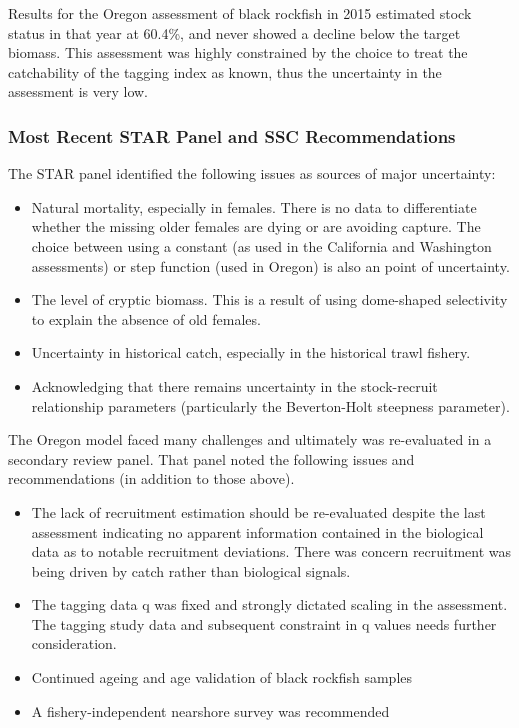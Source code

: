 \documentclass[11pt,
  english,
  letterpaper,
]{article}
\providecommand{\tightlist}{%
  \setlength{\itemsep}{0pt}\setlength{\parskip}{0pt}}
\providecommand{\tightlist}{%
  \setlength{\itemsep}{0pt}\setlength{\parskip}{0pt}}
\begin{document}
Results for the Oregon assessment of black rockfish in 2015 estimated stock status in that year at 60.4\%, and never showed a decline below the target biomass. This assessment was highly constrained by the choice to treat the catchability of the tagging index as known, thus the uncertainty in the assessment is very low.

\hypertarget{most-recent-star-panel-and-ssc-recommendations}{%
\subsubsection{Most Recent STAR Panel and SSC Recommendations}\label{most-recent-star-panel-and-ssc-recommendations}}

The STAR panel identified the following issues as sources of major uncertainty:

\begin{itemize}
\tightlist
\item
  Natural mortality, especially in females. There is no data to differentiate whether the missing older females are dying or are avoiding capture. The choice between using a constant (as used in the California and Washington assessments) or step function (used in Oregon) is also an point of uncertainty.
\item
  The level of cryptic biomass. This is a result of using dome-shaped selectivity to explain the absence of old females.
\item
  Uncertainty in historical catch, especially in the historical trawl fishery.
\item
  Acknowledging that there remains uncertainty in the stock-recruit relationship parameters (particularly the Beverton-Holt steepness parameter).
\end{itemize}

The Oregon model faced many challenges and ultimately was re-evaluated in a secondary review panel. That panel noted the following issues and recommendations (in addition to those above).

\begin{itemize}
\tightlist
\item
  The lack of recruitment estimation should be re-evaluated despite the last assessment indicating no apparent information contained in the biological data as to notable recruitment deviations. There was concern recruitment was being driven by catch rather than biological signals.
\item
  The tagging data q was fixed and strongly dictated scaling in the assessment. The tagging study data and subsequent constraint in q values needs further consideration.
\item
  Continued ageing and age validation of black rockfish samples
\item
  A fishery-independent nearshore survey was recommended
\end{itemize}
\end{document}
